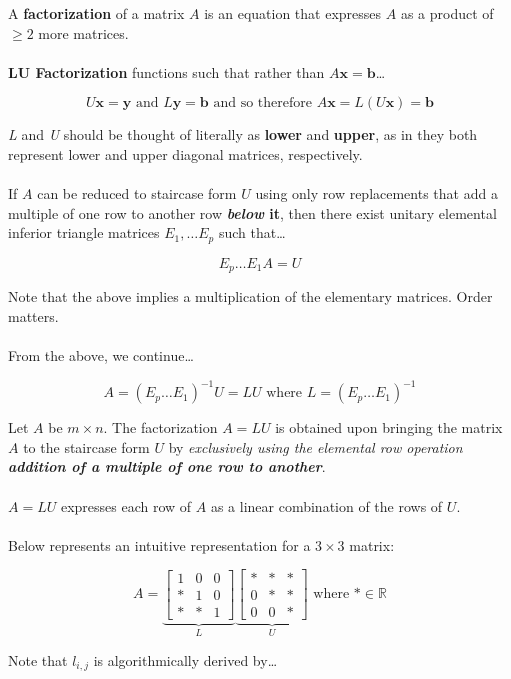 \documentclass[12pt]{article}
\newcommand{\R}{\mathbb{R}}
\newcommand{\bt}[1]{\textbf{{#1}}}
\newcommand{\bm}[1]{\mathbf{{#1}}}
\newcommand{\mb}{\begin{bmatrix}}
\newcommand{\me}{\end{bmatrix}}
\begin{document}
A \textbf{factorization} of a matrix $A$ is an equation that expresses $A$ as a product of $\geq 2$ more matrices. \\ \\

\textbf{LU Factorization} functions such that rather than $A\bm{x} = \bm{b}$\dots

$$U\bm{x} = \bm{y} \textrm{ and } L\bm{y} = \bm{b}  \textrm{ and so therefore } A\bm{x} = L(U\bm{x}) = \bm{b}$$

\emph{L} and \emph{U} should be thought of literally as \bt{lower} and \bt{upper}, as in they both represent lower and upper diagonal matrices, respectively. \\ \\

If $A$ can be reduced to staircase form $U$ using only row replacements that add a multiple of one row to another row \textbf{\emph{below} it}, then
there exist unitary elemental inferior triangle matrices $E_1,\dots E_p$ such that\dots

$$E_p \dots E_1A = U$$

Note that the above implies a multiplication of the elementary matrices. Order matters. \\ \\

From the above, we continue\dots

$$A = (E_p\dots E_1)^{-1}U = LU \textrm{ where } L = (E_p\dots E_1)^{-1}$$

Let $A$ be $m\times n$. The factorization $A = LU$ is obtained upon bringing the matrix $A$ to the staircase form $U$ by
\emph{exclusively using the elemental row operation \textbf{addition of a multiple of one row to another}}. \\ \\

$A = LU$ expresses each row of $A$ as a linear combination of the rows of $U$. \\ \\

Below represents an intuitive representation for a $3 \times 3$ matrix:

$$ A = \underbrace{\mb
1 & 0 & 0 \\
* & 1 & 0 \\
* & * & 1 \me}_{L}
\underbrace{\mb
* & * & * \\
0 & * & * \\
0 & 0 & * \me}_{U} \textrm{ where $* \in \R$}
$$

Note that $l_{i,j}$ is algorithmically derived by\dots
\end{document}
